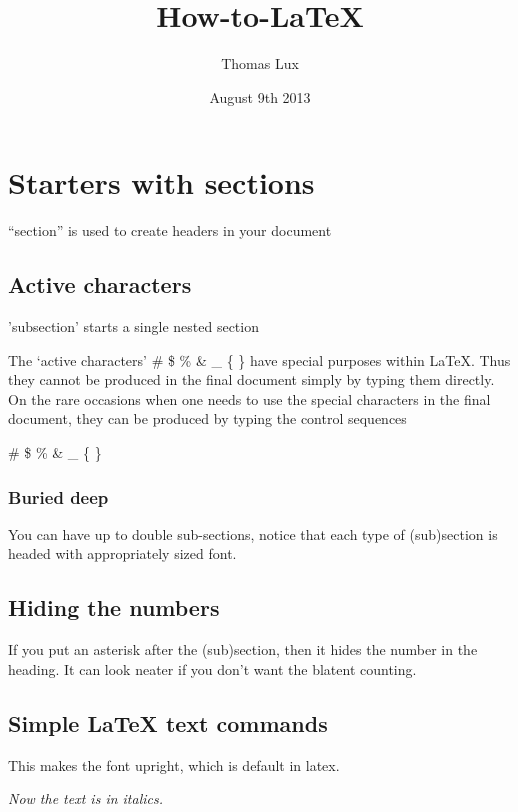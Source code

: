 \documentclass[a4paper, 10pt]{article}
\title{How-to-LaTeX}
\author{Thomas Lux}
\date{August 9th 2013}
\begin{document}
\maketitle

\doublespacing %


\section{Starters with sections}
``section'' is used to create headers in your document

\subsection{Active characters}
'subsection' starts a single nested section

 The `active characters'  \# \$ \% \& \_ \{ \}
have special purposes within LaTeX. Thus they cannot be produced in
the final document simply by typing them directly. On the rare
occasions when one needs to use the special characters in the final
document, they can be produced by typing the control sequences

  \# \$ \% \& \_ \{ \}

\subsubsection{Buried deep}
You can have up to  double sub-sections, notice that each type of
(sub)section is headed with appropriately sized font.

\subsection*{Hiding the numbers}
If you put an asterisk after the (sub)section, then it hides the
number in the heading.  It can look neater if you don't want the
blatent counting.

\subsection*{Simple LaTeX text commands}

\textup{ This makes the font upright, which is default in latex.}

\textit{ Now the text is in italics.}
\end{document}
